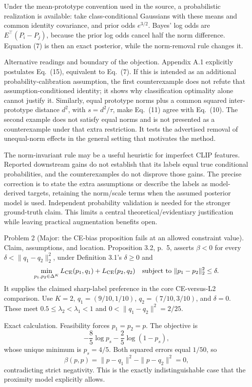 \documentclass[10pt]{article}
\begin{document}
Under the mean-prototype convention used in the source, a probabilistic realization is available: take class-conditional Gaussians with these means and common identity covariance, and prior odds \(e^{3/2}\). Bayes’ log odds are \(E^\top(P_i-P_j)\), because the prior log odds cancel half the norm difference. Equation (7) is then an exact posterior, while the norm-removal rule changes it.\par
Alternative readings and boundary of the objection. Appendix A.1 explicitly postulates Eq. (15), equivalent to Eq. (7). If this is intended as an additional probability-calibration assumption, the first counterexample does not refute that assumption-conditioned identity; it shows why classification optimality alone cannot justify it. Similarly, equal prototype norms plus a common squared inter-prototype distance \(d^2\), with \(s=d^2/\tau\), make Eq. (11) agree with Eq. (10). The second example does not satisfy equal norms and is not presented as a counterexample under that extra restriction. It tests the advertised removal of unequal-norm effects in the general setting that motivates the method.\par
The norm-invariant rule may be a useful heuristic for imperfect CLIP features. Reported downstream gains do not establish that its labels equal true conditional probabilities, and the counterexamples do not disprove those gains. The precise correction is to state the extra assumptions or describe the labels as model-derived targets, retaining the norm/scale terms when the assumed posterior model is used. Independent probability validation is needed for the stronger ground-truth claim. This limits a central theoretical/evidentiary justification while leaving practical augmentation benefits open.\par
Problem 2 (Major: the CE-bias proposition fails at an allowed constraint value).  Claim, assumptions, and location. Proposition 3.2, p. 5, asserts \(\beta<0\) for every \(\delta<\|q_1-q_2\|_2^2\), under Definition 3.1’s \(\delta\geq0\) and \[\min_{p_1,p_2\in\Delta^K}
 L_{\rm CE}(p_1,q_1)+L_{\rm CE}(p_2,q_2)
 \quad\text{subject to }\|p_1-p_2\|_2^2\leq\delta.\] It supplies the claimed sharp-label preference in the core CE-versus-L2 comparison. Use \(K=2\), \(q_1=(9/10,1/10)\), \(q_2=(7/10,3/10)\), and \(\delta=0\). These meet \(0.5\leq\lambda_2<\lambda_1<1\) and \(0<\|q_1-q_2\|^2=2/25\).\par
Exact calculation. Feasibility forces \(p_1=p_2=p\). The objective is \[-\frac85\log p_s-\frac25\log(1-p_s),\] whose unique minimum is \(p_s=4/5\). Both squared errors equal \(1/50\), so \[\beta(p,p)=\|p-q_1\|^2-\|p-q_2\|^2=0,\] contradicting strict negativity. This is the exactly indistinguishable case that the proximity model explicitly allows.\par
\end{document}

